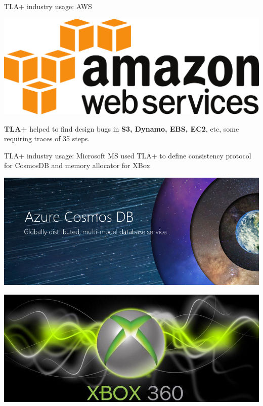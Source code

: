 \documentclass[12pt]{beamer}
\begin{document}
  \begin{frame}{TLA+ industry usage: AWS}
    \begin{center}
       \includegraphics[scale=0.08]{figures/aws}
    \end{center}
      \textbf{TLA+} helped to find design bugs in \textbf{S3, Dynamo, EBS, EC2},
      etc, some requiring traces of 35 steps.~\cite{aws2014}
  \end{frame}
  \begin{frame}{TLA+ industry usage: Microsoft}
      MS used TLA+ to define consistency protocol for CosmosDB and memory
      allocator for XBox~\cite{ms2017}
    \begin{center}
        \includegraphics[scale=0.2]{figures/cosmos}
    \end{center}
    \begin{center}
        \includegraphics[scale=0.2]{figures/xbox}
    \end{center}
  \end{frame}
\end{document}
